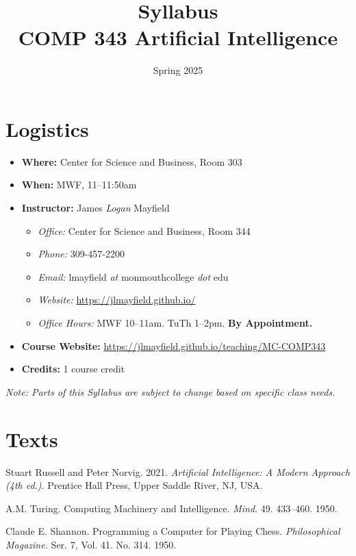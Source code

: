 \documentclass[10pt]{article}
\title{Syllabus \\ COMP 343 Artificial Intelligence}
\author{}
\date{Spring 2025}
\begin{document}
\maketitle

\section{Logistics}
\begin{itemize}
\item \textbf{Where: } Center for Science and Business, Room 303
\item \textbf{When: } MWF,  11--11:50am
\item \textbf{Instructor:} James \textit{Logan} Mayfield
\begin{itemize}
\item \textit{Office: } Center for Science and Business, Room 344
\item \textit{Phone: } 309-457-2200 %
\item \textit{Email: } lmayfield \textit{at} monmouthcollege \textit{dot} edu
\item \textit{Website: } \url{https://jlmayfield.github.io/}
\item \textit{Office Hours: } MWF 10–11am. TuTh 1–2pm. \textbf{By Appointment.}
\end{itemize}
\item \textbf{Course Website: } \url{https://jlmayfield.github.io/teaching/MC-COMP343}
\item \textbf{Credits: } 1 course credit
\end{itemize}
\emph{Note: Parts of this Syllabus are subject to change based on specific class needs.}

\section{Texts}

\noindent Stuart Russell and Peter Norvig. 2021. \textit{Artificial Intelligence: A Modern Approach (4th ed.)}. Prentice Hall Press, Upper Saddle River, NJ, USA\@.
\newline

\noindent A.M. Turing. Computing Machinery and Intelligence. \textit{Mind}. 49. 433--460. 1950. 
\newline

\noindent Claude E. Shannon. Programming a Computer for Playing Chess. \textit{Philosophical Magazine.} Ser. 7, Vol. 41. No. 314. 1950. 
\newline
\end{document}
